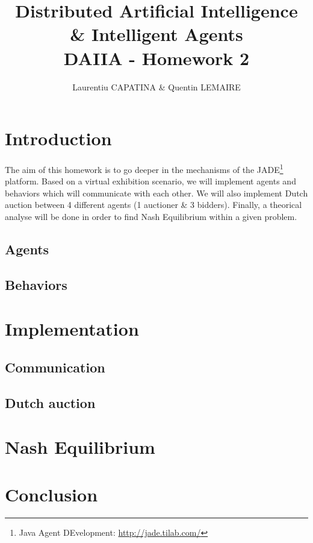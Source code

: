 \documentclass[a4paper,11pt]{article}
\title{Distributed Artificial Intelligence \& Intelligent Agents \\ DAIIA - Homework 2}
\author{Laurentiu CAPATINA \& Quentin LEMAIRE}
\begin{document}
  \maketitle %

  \section{Introduction}
  
  The aim of this homework is to go deeper in the mechanisms of the JADE\footnote{Java Agent DEvelopment: \href{http://jade.tilab.com/}{http://jade.tilab.com/}} platform. 
  Based on a virtual exhibition scenario, we will implement agents and behaviors which will communicate with each other. We will also implement Dutch auction between 4 different agents (1 auctioner \& 3 bidders). Finally, a theorical analyse will be done in order to find Nash Equilibrium within a given problem.
  
  \subsection{Agents}


  \subsection{Behaviors}
 

  \newcommand{\pa}{\textit{Profiler Agent}}
  \newcommand{\cu}{\textit{Curator Agent}}
  \renewcommand{\to}{\textit{Tour Guide Agent}}
  
  \section{Implementation}
  
  \subsection{Communication}


  \subsection{Dutch auction}


  \section{Nash Equilibrium}


  \section{Conclusion}
  
\end{document}
